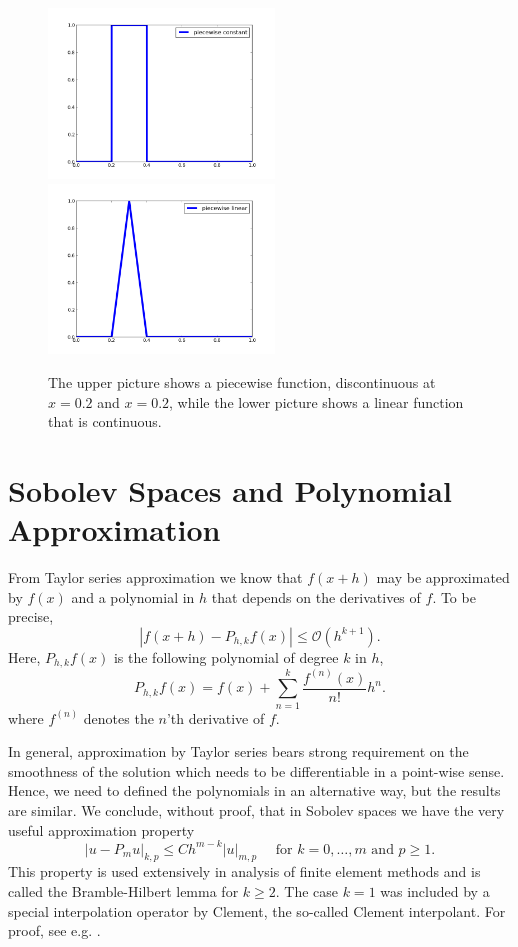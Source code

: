 \begin{figure}
\begin{center}
\includegraphics[width=6cm]{chapters/SobolevCrash/pc.png}
\includegraphics[width=6cm]{chapters/SobolevCrash/pl.png}
\caption{The upper picture shows a piecewise function, discontinuous at $x=0.2$ and $x=0.2$, while
the lower picture shows a linear function that is continuous. }  
\label{fig:piecewise}
\end{center}
\end{figure}

\section{Sobolev Spaces and Polynomial Approximation}
From Taylor series approximation we know that  $f(x+h)$ may be approximated
by $f(x)$ and a polynomial in $h$ that depends on the derivatives of $f$. 
To be precise, 
\[
|f(x+h) - P_{h,k} f (x) |  \le  \mathcal{O}(h^{k+1}) .    
\]
Here, $P_{h,k} f(x)$ is the following polynomial of degree $k$ in $h$, 
\[
P_{h,k} f(x) = f(x) + \sum_{n=1}^k \frac{f^{(n)}(x)}{n!} h^n . 
\]
where $f^{(n)}$ denotes the $n$'th derivative of $f$. 

In general, approximation by Taylor series bears strong requirement on the smoothness 
of the solution which needs to be differentiable in a point-wise sense.   
Hence, we need to defined the polynomials in an alternative way, but the
results are similar.  We conclude, without proof, that  in Sobolev spaces we have the very useful approximation property  
\begin{equation}
\label{bramblehilbert}
|u - P_m u|_{k,p} \le C h^{m-k} |u|_{m,p} \quad \mbox{ for } k=0,\ldots,m \mbox{ and }  p\ge 1. 
\end{equation}
This property is used extensively in analysis of finite element methods and
is called the Bramble-Hilbert lemma for $k\ge 2$. The case $k=1$ was included by a special interpolation operator by 
Clement, the so-called Clement interpolant. 
For proof, see e.g. \cite{braess2007finite, brenner2008mathematical}.  




